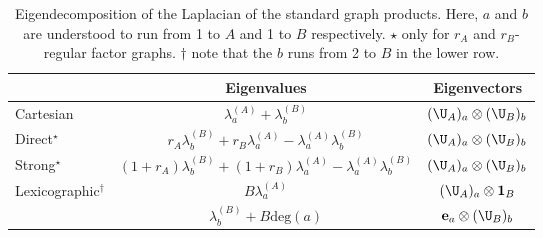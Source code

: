 \begin{table}[h]
    \def\arraystretch{1.8}
    \centering
    \small
    \vspace{0.5cm}
    \begin{tabular}{|l|cc|}
        \hline

         & Eigenvalues
         & Eigenvectors                                                                          \\

        \hline

        Cartesian
         & $\lambda_a^{(A)} + \lambda_b^{(B)}$
         & $(\U_A)_a \otimes (\U_B)_b$                                                           \\

        Direct$^{\star}$
         & $r_A \lambda_b^{(B)} + r_B \lambda_a^{(A)} - \lambda_a^{(A)} \lambda_b^{(B)}$
         & $(\U_A)_a \otimes (\U_B)_b$                                                           \\

        Strong$^{\star}$
         & $(1+r_A) \lambda_b^{(B)} + (1+r_B) \lambda_a ^{(A)}- \lambda_a^{(A)} \lambda_b^{(B)}$
         & $(\U_A)_a \otimes (\U_B)_b$                                                           \\

        \multirow{2}{7em}{Lexicographic$^\dagger$}
         & $B \lambda_a^{(A)}$
         & $(\U_A)_a \otimes \mathbf{1}_B$                                                       \\

         & $\lambda_b^{(B)} + B \text{deg}(a)$
         & $\mathbf{e}_a \otimes (\U_B)_b$                                                       \\

        \hline
    \end{tabular}
    \vspace{0.2cm}
    \caption[Spectral decomposition of product graphs]{Eigendecomposition of the Laplacian of the standard graph products. Here, $a$ and $b$ are understood to run from 1 to $A$ and 1 to $B$ respectively. $\star$ only for $r_A$ and $r_B$-regular factor graphs. $\dagger$ note that the $b$ runs from 2 to $B$ in the lower row. }
    \vspace{0.3cm}
    \label{tab:product_graph_spectra}
\end{table}



